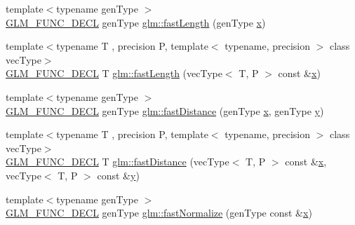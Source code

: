 \begin{DoxyCompactItemize}
\item 
{\footnotesize template$<$typename gen\+Type $>$ }\\\mbox{\hyperlink{setup_8hpp_ab2d052de21a70539923e9bcbf6e83a51}{G\+L\+M\+\_\+\+F\+U\+N\+C\+\_\+\+D\+E\+CL}} gen\+Type \mbox{\hyperlink{group__gtx__fast__square__root_gafe697d6287719538346bbdf8b1367c59}{glm\+::fast\+Length}} (gen\+Type \mbox{\hyperlink{glad_8h_a92d0386e5c19fb81ea88c9f99644ab1d}{x}})
\item 
{\footnotesize template$<$typename T , precision P, template$<$ typename, precision $>$ class vec\+Type$>$ }\\\mbox{\hyperlink{setup_8hpp_ab2d052de21a70539923e9bcbf6e83a51}{G\+L\+M\+\_\+\+F\+U\+N\+C\+\_\+\+D\+E\+CL}} T \mbox{\hyperlink{group__gtx__fast__square__root_gae28a3099cbd6404a4ea8ef22147ed7b0}{glm\+::fast\+Length}} (vec\+Type$<$ T, P $>$ const \&\mbox{\hyperlink{glad_8h_a92d0386e5c19fb81ea88c9f99644ab1d}{x}})
\item 
{\footnotesize template$<$typename gen\+Type $>$ }\\\mbox{\hyperlink{setup_8hpp_ab2d052de21a70539923e9bcbf6e83a51}{G\+L\+M\+\_\+\+F\+U\+N\+C\+\_\+\+D\+E\+CL}} gen\+Type \mbox{\hyperlink{group__gtx__fast__square__root_gaac333418d0c4e0cc6d3d219ed606c238}{glm\+::fast\+Distance}} (gen\+Type \mbox{\hyperlink{glad_8h_a92d0386e5c19fb81ea88c9f99644ab1d}{x}}, gen\+Type \mbox{\hyperlink{glad_8h_a66ddd433d2cacfe27f5906b7e86faeed}{y}})
\item 
{\footnotesize template$<$typename T , precision P, template$<$ typename, precision $>$ class vec\+Type$>$ }\\\mbox{\hyperlink{setup_8hpp_ab2d052de21a70539923e9bcbf6e83a51}{G\+L\+M\+\_\+\+F\+U\+N\+C\+\_\+\+D\+E\+CL}} T \mbox{\hyperlink{group__gtx__fast__square__root_ga6d1ac559cd77d69119e30c3aca0e14b5}{glm\+::fast\+Distance}} (vec\+Type$<$ T, P $>$ const \&\mbox{\hyperlink{glad_8h_a92d0386e5c19fb81ea88c9f99644ab1d}{x}}, vec\+Type$<$ T, P $>$ const \&\mbox{\hyperlink{glad_8h_a66ddd433d2cacfe27f5906b7e86faeed}{y}})
\item 
{\footnotesize template$<$typename gen\+Type $>$ }\\\mbox{\hyperlink{setup_8hpp_ab2d052de21a70539923e9bcbf6e83a51}{G\+L\+M\+\_\+\+F\+U\+N\+C\+\_\+\+D\+E\+CL}} gen\+Type \mbox{\hyperlink{group__gtx__fast__square__root_ga3b02c1d6e0c754144e2f1e110bf9f16c}{glm\+::fast\+Normalize}} (gen\+Type const \&\mbox{\hyperlink{glad_8h_a92d0386e5c19fb81ea88c9f99644ab1d}{x}})
\end{DoxyCompactItemize}


